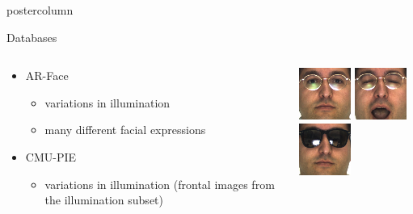 \documentclass[final,hyperref={pdfpagelabels=false}]{beamer}
\begin{document}
\begin{frame}
\begin{columns}
\begin{column}{.49\textwidth}
\begin{beamercolorbox}[center,wd=\textwidth]{postercolumn}
\begin{minipage}[T]{.95\textwidth}
{            \begin{block}{Databases}
              \begin{columns}
                \begin{column}{.6\textwidth}
                  \begin{itemize}
                  \item AR-Face 
                    \begin{itemize}
                    \item variations in illumination
                    \item many different facial expressions
                    \end{itemize}
                  \item CMU-PIE
                    \begin{itemize}
                    \item variations in illumination (frontal images from the illumination subset)
                    \end{itemize}
                  \end{itemize}
                \end{column}
                \begin{column}{.39\textwidth}
                  \includegraphics[width=0.22\linewidth]{hanselmann-databases/arface/train/png/occlusions/arneutral/m-016-1}
                  \-
                  \includegraphics[width=0.22\linewidth]{hanselmann-databases/arface/train/png/cropped/m-016-4}
                  \-
                  \includegraphics[width=0.22\linewidth]{hanselmann-databases/arface/test/png/occlusions/ar1sun/m-016-8}

\end{column}
\end{columns}
\end{block}}
\end{minipage}
\end{beamercolorbox}
\end{column}
\end{columns}
\end{frame}
\end{document}
